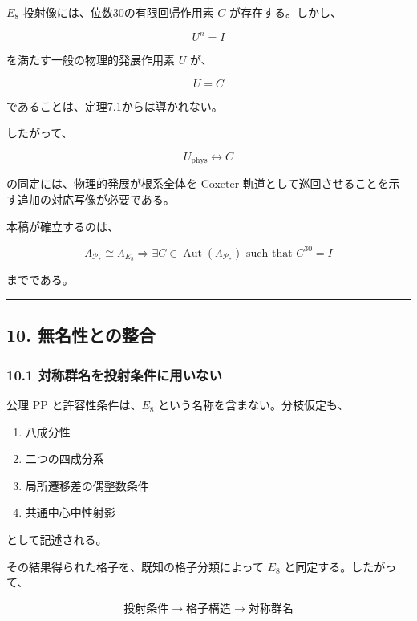 \documentclass[
  a4paper,
  ja=minimal,
  xelatex,
  paragraph-mark={},
]{bxjsarticle}
\providecommand{\tightlist}{%
  \setlength{\itemsep}{0pt}\setlength{\parskip}{0pt}}
\begin{document}
\(E_8\) 投射像には、位数30の有限回帰作用素 \(C\) が存在する。しかし、

\[
U^n=I
\]

を満たす一般の物理的発展作用素 \(U\) が、

\[
U=C
\]

であることは、定理7.1からは導かれない。

したがって、

\[
U_{\mathrm{phys}}
\longleftrightarrow
C
\]

の同定には、物理的発展が根系全体を Coxeter
軌道として巡回させることを示す追加の対応写像が必要である。

本稿が確立するのは、

\[
\boxed{
\Lambda_{\mathcal P_*}
\cong
\Lambda_{E_8}
\Longrightarrow
\exists C\in\operatorname{Aut}(\Lambda_{\mathcal P_*})
\text{ such that }
C^{30}=I
}
\]

までである。

\begin{center}\rule{0.5\linewidth}{0.5pt}\end{center}

\subsection{10.
無名性との整合}\label{ux7121ux540dux6027ux3068ux306eux6574ux5408}

\subsubsection{10.1
対称群名を投射条件に用いない}\label{ux5bfeux79f0ux7fa4ux540dux3092ux6295ux5c04ux6761ux4ef6ux306bux7528ux3044ux306aux3044}

公理 PP と許容性条件は、\(E_8\) という名称を含まない。分枝仮定も、

\begin{enumerate}
\def\labelenumi{\arabic{enumi}.}
\tightlist
\item
  八成分性
\item
  二つの四成分系
\item
  局所遷移差の偶整数条件
\item
  共通中心中性射影
\end{enumerate}

として記述される。

その結果得られた格子を、既知の格子分類によって \(E_8\)
と同定する。したがって、

\[
\boxed{
\text{投射条件}
\longrightarrow
\text{格子構造}
\longrightarrow
\text{対称群名}
}
\]
\end{document}

